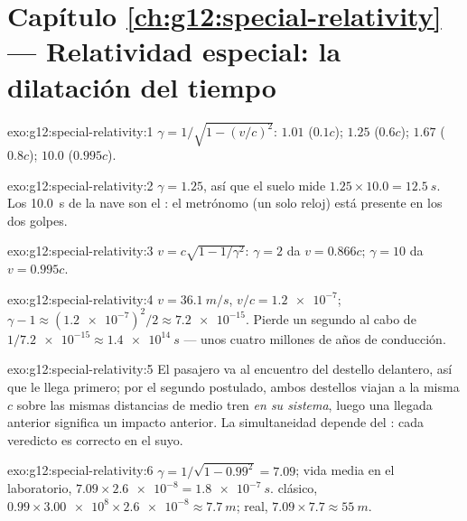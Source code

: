 \section*{Capítulo \ref{ch:g12:special-relativity} --- Relatividad especial: la dilatación del tiempo}

\begin{solution}{exo:g12:special-relativity:1}
$\gamma = 1/\sqrt{1 - (v/c)^2}$: $1.01$ ($0.1c$); $1.25$ ($0.6c$);
$1.67$ ($0.8c$); $10.0$ ($0.995c$).
\end{solution}

\begin{solution}{exo:g12:special-relativity:2}
$\gamma = 1.25$, así que el suelo mide
$1.25 \times 10.0 = \qty{12.5}{s}$. Los \qty{10.0}{s} de la nave son el
: el metrónomo (un solo reloj) está presente en los dos
golpes.
\end{solution}

\begin{solution}{exo:g12:special-relativity:3}
$v = c\sqrt{1 - 1/\gamma^2}$: $\gamma = 2$ da $v = 0.866c$;
$\gamma = 10$ da $v = 0.995c$.
\end{solution}

\begin{solution}{exo:g12:special-relativity:4}
$v = \qty{36.1}{m/s}$, $v/c = \num{1.2e-7}$;
$\gamma - 1 \approx (\num{1.2e-7})^2/2 \approx \num{7.2e-15}$. Pierde un
segundo al cabo de $1/\num{7.2e-15} \approx \qty{1.4e14}{s}$ --- unos
cuatro millones de años de conducción.
\end{solution}

\begin{solution}{exo:g12:special-relativity:5}
El pasajero va al encuentro del destello delantero, así que le llega
primero; por el segundo postulado, ambos destellos viajan a la misma $c$
sobre las mismas distancias de medio tren \emph{en su sistema}, luego
una llegada anterior significa un impacto anterior. La simultaneidad
depende del : cada veredicto es correcto en el
suyo.
\end{solution}

\begin{solution}{exo:g12:special-relativity:6}
$\gamma = 1/\sqrt{1 - 0.99^2} = 7.09$; vida media en el laboratorio,
$7.09 \times \num{2.6e-8} = \qty{1.8e-7}{s}$.  clásico,
$0.99 \times \num{3.00e8} \times \num{2.6e-8} \approx \qty{7.7}{m}$;
real, $7.09 \times 7.7 \approx \qty{55}{m}$.
\end{solution}


